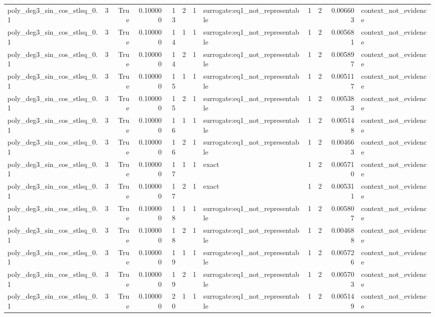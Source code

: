 \begin{tabular}{lrrrrrrlrrrl}
poly\_deg3\_sin\_cos\_stlsq\_0.1 & 3 & True & 0.100000 & 13 & 2 & 1 & surrogate:eq1\_not\_representable & 1 & 2 & 0.006603 & context\_not\_evidence \\
poly\_deg3\_sin\_cos\_stlsq\_0.1 & 3 & True & 0.100000 & 14 & 1 & 1 & surrogate:eq1\_not\_representable & 1 & 2 & 0.005681 & context\_not\_evidence \\
poly\_deg3\_sin\_cos\_stlsq\_0.1 & 3 & True & 0.100000 & 14 & 2 & 1 & surrogate:eq1\_not\_representable & 1 & 2 & 0.005897 & context\_not\_evidence \\
poly\_deg3\_sin\_cos\_stlsq\_0.1 & 3 & True & 0.100000 & 15 & 1 & 1 & surrogate:eq1\_not\_representable & 1 & 2 & 0.005117 & context\_not\_evidence \\
poly\_deg3\_sin\_cos\_stlsq\_0.1 & 3 & True & 0.100000 & 15 & 2 & 1 & surrogate:eq1\_not\_representable & 1 & 2 & 0.005383 & context\_not\_evidence \\
poly\_deg3\_sin\_cos\_stlsq\_0.1 & 3 & True & 0.100000 & 16 & 1 & 1 & surrogate:eq1\_not\_representable & 1 & 2 & 0.005148 & context\_not\_evidence \\
poly\_deg3\_sin\_cos\_stlsq\_0.1 & 3 & True & 0.100000 & 16 & 2 & 1 & surrogate:eq1\_not\_representable & 1 & 2 & 0.004663 & context\_not\_evidence \\
poly\_deg3\_sin\_cos\_stlsq\_0.1 & 3 & True & 0.100000 & 17 & 1 & 1 & exact & 1 & 2 & 0.005710 & context\_not\_evidence \\
poly\_deg3\_sin\_cos\_stlsq\_0.1 & 3 & True & 0.100000 & 17 & 2 & 1 & exact & 1 & 2 & 0.005311 & context\_not\_evidence \\
poly\_deg3\_sin\_cos\_stlsq\_0.1 & 3 & True & 0.100000 & 18 & 1 & 1 & surrogate:eq1\_not\_representable & 1 & 2 & 0.005807 & context\_not\_evidence \\
poly\_deg3\_sin\_cos\_stlsq\_0.1 & 3 & True & 0.100000 & 18 & 2 & 1 & surrogate:eq1\_not\_representable & 1 & 2 & 0.004688 & context\_not\_evidence \\
poly\_deg3\_sin\_cos\_stlsq\_0.1 & 3 & True & 0.100000 & 19 & 1 & 1 & surrogate:eq1\_not\_representable & 1 & 2 & 0.005726 & context\_not\_evidence \\
poly\_deg3\_sin\_cos\_stlsq\_0.1 & 3 & True & 0.100000 & 19 & 2 & 1 & surrogate:eq1\_not\_representable & 1 & 2 & 0.005703 & context\_not\_evidence \\
poly\_deg3\_sin\_cos\_stlsq\_0.1 & 3 & True & 0.100000 & 20 & 1 & 1 & surrogate:eq1\_not\_representable & 1 & 2 & 0.005149 & context\_not\_evidence \\

\end{tabular}
